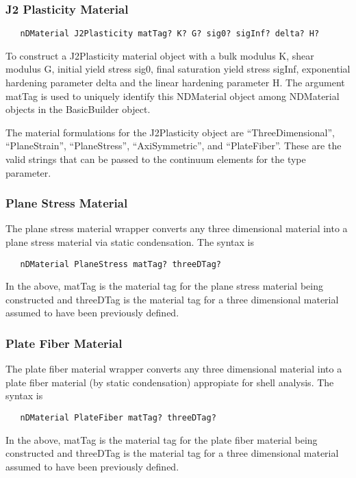 \documentclass[12pt]{article}
\begin{document}
\subsubsection{J2 Plasticity Material}
{\sf\small
\begin{verbatim}
   nDMaterial J2Plasticity matTag? K? G? sig0? sigInf? delta? H?
\end{verbatim}
}

To construct a J2Plasticity material object with a bulk modulus
K, shear modulus G, initial yield stress sig0, final saturation yield
stress sigInf, exponential hardening parameter delta and the linear
hardening parameter H. The argument matTag is used to uniquely
identify this NDMaterial object among NDMaterial objects in the
BasicBuilder object. 

The material formulations for the J2Plasticity object are ``ThreeDimensional'',
``PlaneStrain'', ``PlaneStress'', ``AxiSymmetric'', and ``PlateFiber''.  These are
the valid strings that can be passed to the continuum elements for the type
parameter. 


\subsubsection{Plane Stress Material}
The plane stress material wrapper converts any three dimensional 
material into a plane stress material via static condensation.
The syntax is
{\sf\small
\begin{verbatim}
   nDMaterial PlaneStress matTag? threeDTag? 
\end{verbatim}
}
In the above, matTag is the material tag for the plane stress material 
being constructed and threeDTag is the material tag for a three 
dimensional material assumed to have been previously defined.


\subsubsection{Plate Fiber Material}
The plate fiber material wrapper converts any three dimensional 
material into a plate fiber material (by static condensation) appropiate
for shell analysis.
The syntax is
{\sf\small
\begin{verbatim}
   nDMaterial PlateFiber matTag? threeDTag? 
\end{verbatim}
}
In the above, matTag is the material tag for the plate fiber material 
being constructed and threeDTag is the material tag for a three 
dimensional material assumed to have been previously defined.
\end{document}
